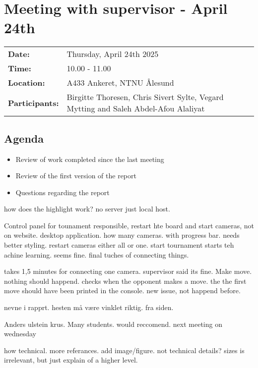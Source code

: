 \section{Meeting with supervisor - April 24th}
\begin{tabular}{ll}
    \textbf{Date:} & Thursday, April 24th 2025 \\
    \textbf{Time:} & 10.00 - 11.00\\
    \textbf{Location:} & A433 Ankeret, NTNU Ålesund \\
    \textbf{Participants:} & Birgitte Thoresen, Chris Sivert Sylte, Vegard Mytting and Saleh Abdel-Afou Alaliyat\\
\end{tabular}

\vspace{0.5cm}

\subsection{Agenda}

\begin{itemize} 
    \item Review of work completed since the last meeting
    \item Review of the first version of the report
    \item Questions regarding the report
\end{itemize}

how does the highlight work? no server just local host. 

Control panel for tounament responsible, restart hte board and start cameras, not on website. desktop application. how many cameras. with progress bar. needs better styling. restart cameras either all or one. start tournament starts teh achine learning. seems fine. final tuches of connecting things. 

takes 1,5 minutes for connecting one camera. supervisor said its fine. Make move. nothing should happend. checks when the opponent makes a move. the the first move should have been printed in the console. new issue, not happend before.

nevne i rapprt. hesten må være vinklet riktig. fra siden. 

Anders ulstein krus. Many students. would reccomend. next meeting on wednesday 

how technical. more referances. add image/figure. not technical details? sizes is irrelevant, but just explain of a higher level. 

